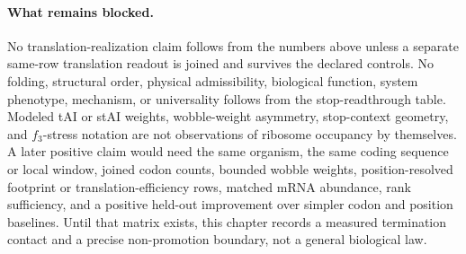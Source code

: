 \paragraph{What remains blocked.}
No translation-realization claim follows from the numbers above unless a separate same-row translation readout is joined and survives the declared controls.  No folding, structural order, physical admissibility, biological function, system phenotype, mechanism, or universality follows from the stop-readthrough table.  Modeled tAI or stAI weights, wobble-weight asymmetry, stop-context geometry, and $f_3$-stress notation are not observations of ribosome occupancy by themselves.  A later positive claim would need the same organism, the same coding sequence or local window, joined codon counts, bounded wobble weights, position-resolved footprint or translation-efficiency rows, matched mRNA abundance, rank sufficiency, and a positive held-out improvement over simpler codon and position baselines.  Until that matrix exists, this chapter records a measured termination contact and a precise non-promotion boundary, not a general biological law.